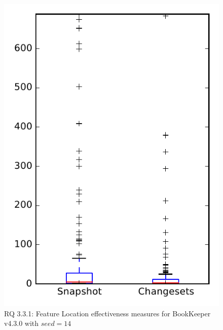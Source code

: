 
\begin{figure}
\centering
\includegraphics[height=0.4\textheight]{figures/flt_seed/rq1_bookkeeper_14}
\caption{RQ 3.3.1: Feature Location effectiveness measures for BookKeeper v4.3.0 with $seed=14$}
\label{fig:flt_seed:rq1:bookkeeper}
\end{figure}
